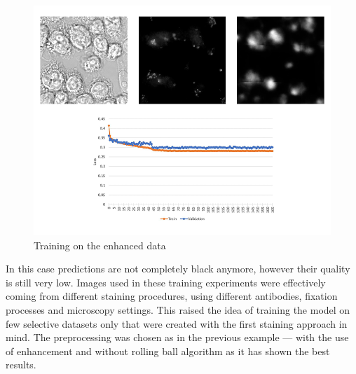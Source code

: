 \begin{figure}[htb]
	\begin{center}
		\includegraphics[width=\linewidth]{bilder/golgi/enhanced-crop.png}
		\caption{Training on the enhanced data}\label{fig:golgi-enhanced-predictions}
	\end{center}
\end{figure}
In this case predictions are not completely black anymore, however their quality is still very low. Images used in these training experiments were effectively coming from different staining procedures, using different antibodies, fixation processes and microscopy settings. This raised the idea of training the model on few selective datasets only that were created with the first staining approach in mind. The preprocessing was chosen as in the previous example --- with the use of enhancement and without rolling ball algorithm as it has shown the best results.

